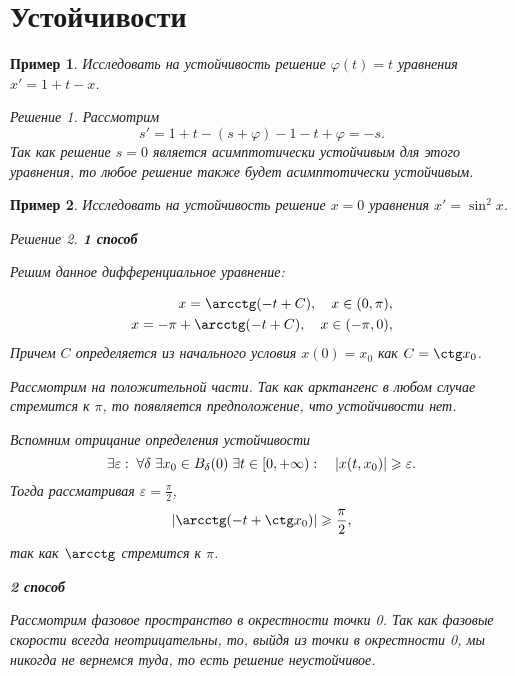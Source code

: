 \documentclass[a5paper, 11pt]{article}
\theoremstyle{definition}
\theoremstyle{plain}
\newtheorem{Ex}{Пример}
\theoremstyle{remark}
\newtheorem*{Solution}{Решение}
\begin{document}
	\section[17.03.2023]{Устойчивости}
	\begin{Ex}
		Исследовать на устойчивость решение $\varphi(t) = t$ уравнения $x'=1+t-x$.
		\begin{Solution}
			Рассмотрим
			\[
			s' = 1+ t -(s+\varphi) - 1-t+\varphi = -s. 
			\]
			Так как решение $s=0$ является асимптотически устойчивым для этого уравнения, то любое решение также будет асимптотически устойчивым.
		\end{Solution}
	\end{Ex}
	\begin{Ex}
		Исследовать на устойчивость решение $x=0$ уравнения $x'=\sin^2 x$.
		\begin{Solution}
			\textbf{1 способ}
			
			Решим данное дифференциальное уравнение:
			
			\[
			\begin{split}
			x = \arcctg(-t+C), \quad x \in (0,\pi),\\
			x = -\pi + \arcctg(-t+C), \quad x \in (-\pi, 0),\\
			\end{split}
			\]
			Причем $C$ определяется из начального условия $x(0) = x_0$ как $C=\ctg x_0$.
			
			Рассмотрим на положительной части. Так как арктангенс в любом случае стремится к $\pi$, то появляется предположение, что устойчивости нет.
			
			Вспомним отрицание определения устойчивости
			\[
			\exists \varepsilon: \; \forall \delta \; \exists x_0 \in B_\delta(0) \; \exists t \in \left[0, +\infty\right): \quad \left|x(t,x_0)\right| \geqslant \varepsilon.
			\]
			Тогда рассматривая $\varepsilon = \frac{\pi}2$, 
			\[
			\hm{\arcctg(-t+\ctg x_0)} \geqslant \frac{\pi}{2}, 
			\]
			так как $\arcctg$ стремится к $\pi$.
			
			\textbf{2 способ}
			
			Рассмотрим фазовое пространство в окрестности точки 0. Так как фазовые скорости всегда неотрицательны, то, выйдя из точки в окрестности 0, мы никогда не вернемся туда, то есть решение неустойчивое.
		\end{Solution}
	\end{Ex}
\end{document}
